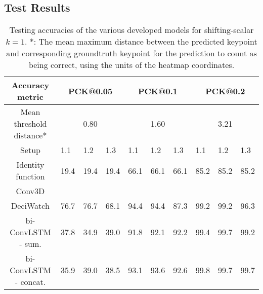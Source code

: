 \documentclass[./main.tex]{subfiles}
\begin{document}
\subsection{Test Results}
\begin{table}[htbp]
    \begin{tabular}{c||lll|lll|lll}
        \hline
        Accuracy metric & \multicolumn{3}{c}{PCK@0.05} & \multicolumn{3}{c}{PCK@0.1} & \multicolumn{3}{c}{PCK@0.2} \\
        \hline
        Mean threshold distance* & \multicolumn{3}{c}{0.80} & \multicolumn{3}{c}{1.60} & \multicolumn{3}{c}{3.21} \\
        \hline
        Setup & 1.1 & 1.2 & 1.3 & 1.1 & 1.2 & 1.3 & 1.1 & 1.2 & 1.3 \\
        \hline
        \hline
        Identity function & 19.4 & 19.4 & 19.4 & 66.1 & 66.1 & 66.1 & 85.2 & 85.2 & 85.2 \\
        Conv3D & & & & & & & & & \\
        DeciWatch & 76.7 & 76.7 & 68.1 & 94.4 & 94.4 & 87.3 & 99.2 & 99.2 & 96.3 \\
        bi-ConvLSTM - sum. & 37.8 & 34.9 & 39.0 & 91.8 & 92.1 & 92.2 & 99.4 & 99.7 & 99.2 \\
        bi-ConvLSTM - concat. & 35.9 & 39.0 & 38.5 & 93.1 & 93.6 & 92.6 & 99.8 & 99.7 & 99.7 \\
        \hline
    \end{tabular}
    \caption{Testing accuracies of the various developed models for shifting-scalar $k = 1$. *: The mean maximum distance between the predicted keypoint and corresponding groundtruth keypoint for the prediction to count as being correct, using the units of the heatmap coordinates.}
    \label{tab:finetune_test_accs_1}
\end{table}
\end{document}
